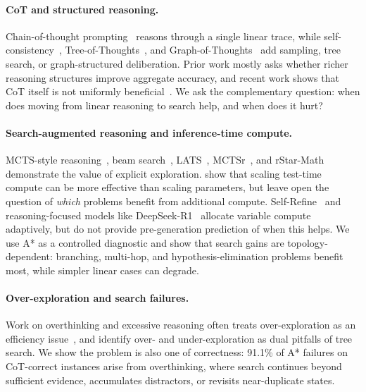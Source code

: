 \documentclass[11pt]{article}
\begin{document}
{\paragraph{CoT and structured reasoning.}
Chain-of-thought prompting~\cite{wei2022chain} reasons through a single linear trace, while self-consistency~\cite{wang2022self}, Tree-of-Thoughts~\cite{yao2024tree}, and Graph-of-Thoughts~\cite{besta2024graph} add sampling, tree search, or graph-structured deliberation. Prior work mostly asks whether richer reasoning structures improve aggregate accuracy, and recent work shows that CoT itself is not uniformly beneficial~\cite{meincke2025cot}. We ask the complementary question: when does moving from linear reasoning to search help, and when does it hurt?

\paragraph{Search-augmented reasoning and inference-time compute.}
MCTS-style reasoning~\cite{hao2023reasoning}, beam search~\cite{xie2024self}, LATS~\cite{zhou2024lats}, MCTSr~\cite{zhang2024mctsrmath}, and rStar-Math~\cite{guan2025rstar} demonstrate the value of explicit exploration. \cite{snell2024scaling} show that scaling test-time compute can be more effective than scaling parameters, but leave open the question of \emph{which} problems benefit from additional compute. Self-Refine~\cite{madaan2023selfrefine} and reasoning-focused models like DeepSeek-R1~\cite{deepseekr1} allocate variable compute adaptively, but do not provide pre-generation prediction of when this helps. We use A* as a controlled diagnostic and show that search gains are topology-dependent: branching, multi-hop, and hypothesis-elimination problems benefit most, while simpler linear cases can degrade.

\paragraph{Over-exploration and search failures.}
Work on overthinking and excessive reasoning often treats over-exploration as an efficiency issue~\cite{sui2025overthinking,wang2025fetch,ma2025cotvalve}, and \cite{wang-etal-2025-dont} identify over- and under-exploration as dual pitfalls of tree search. We show the problem is also one of correctness: 91.1\% of A* failures on CoT-correct instances arise from overthinking, where search continues beyond sufficient evidence, accumulates distractors, or revisits near-duplicate states.

}
\end{document}
